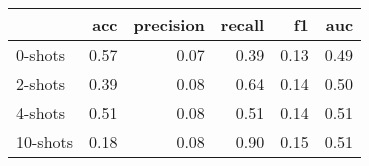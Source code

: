\begin{tabular}{lrrrrr}
\toprule
{} &  acc &  precision &  recall &   f1 &  auc \\
\midrule
0-shots  & 0.57 &       0.07 &    0.39 & 0.13 & 0.49 \\
2-shots  & 0.39 &       0.08 &    0.64 & 0.14 & 0.50 \\
4-shots  & 0.51 &       0.08 &    0.51 & 0.14 & 0.51 \\
10-shots & 0.18 &       0.08 &    0.90 & 0.15 & 0.51 \\
\bottomrule
\end{tabular}
